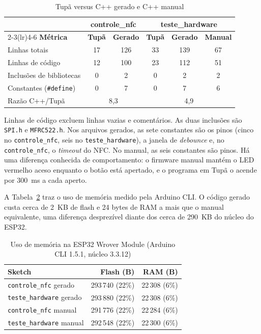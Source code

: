 \documentclass[conference]{IEEEtran}
\begin{document}
\begin{table}[htbp]
\caption{Tupã versus C++ gerado e C++ manual}
\begin{center}
\setlength{\tabcolsep}{3pt}
\begin{tabular}{lccccc}
\toprule
 & \multicolumn{2}{c}{\textbf{controle\_nfc}} & \multicolumn{3}{c}{\textbf{teste\_hardware}} \\
\cmidrule(lr){2-3}\cmidrule(lr){4-6}
\textbf{Métrica} & \textbf{Tupã} & \textbf{Gerado} & \textbf{Tupã} & \textbf{Gerado} & \textbf{Manual} \\
\midrule
Linhas totais             & 17 & 126 & 33 & 139 & 67 \\
Linhas de código          & 12 & 100 & 23 & 112 & 51 \\
Inclusões de bibliotecas  & 0  & 2   & 0  & 2   & 2  \\
Constantes (\texttt{\#define}) & 0 & 7 & 0 & 7 & 6 \\
Razão C++/Tupã            & \multicolumn{2}{c}{8,3} & \multicolumn{3}{c}{4,9} \\
\bottomrule
\end{tabular}
\label{tab:comparacao}
\end{center}
\end{table}

Linhas de código excluem linhas vazias e comentários. As duas inclusões são
\texttt{SPI.h} e \texttt{MFRC522.h}. Nos arquivos gerados, as sete constantes
são os pinos (cinco no \texttt{controle\_nfc}, seis no \texttt{teste\_hardware}),
a janela de \textit{debounce} e, no \texttt{controle\_nfc}, o \textit{timeout} do NFC. No manual, as seis constantes são pinos. Há uma diferença
conhecida de comportamento: o firmware manual mantém o LED vermelho aceso
enquanto o botão está apertado, e o programa em Tupã o acende por 300~ms a cada
aperto.

A Tabela~\ref{tab:memoria} traz o uso de memória medido pela Arduino CLI. O
código gerado custa cerca de 2~KB de flash e 24 bytes de RAM a mais que o
manual equivalente, uma diferença desprezível diante dos cerca de 290~KB do
núcleo do ESP32.

\begin{table}[htbp]
\caption{Uso de memória na ESP32 Wrover Module (Arduino CLI 1.5.1, núcleo 3.3.12)}
\begin{center}
\footnotesize
\setlength{\tabcolsep}{3pt}
\begin{tabular}{lrr}
\toprule
\textbf{Sketch} & \textbf{Flash (B)} & \textbf{RAM (B)} \\
\midrule
\texttt{controle\_nfc} gerado & 293\,740 (22\%) & 22\,308 (6\%) \\
\texttt{teste\_hardware} gerado & 293\,880 (22\%) & 22\,308 (6\%) \\
\texttt{controle\_nfc} manual & 291\,776 (22\%) & 22\,284 (6\%) \\
\texttt{teste\_hardware} manual & 292\,548 (22\%) & 22\,300 (6\%) \\
\bottomrule
\end{tabular}
\label{tab:memoria}
\end{center}
\end{table}
\end{document}
